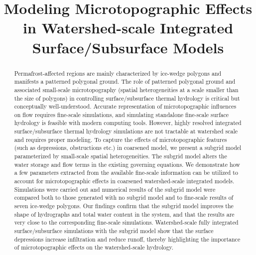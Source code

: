 \documentclass[review,11pt]{elsarticle}
\begin{document}
\begin{frontmatter}

\title{Modeling Microtopographic Effects in Watershed-scale Integrated Surface/Subsurface Models}





\begin{abstract}
Permafrost-affected regions are mainly characterized by ice-wedge polygons and manifests a patterned polygonal ground. The role of patterned polygonal ground and associated small-scale microtopography (spatial heterogeneities at a scale smaller than the size of polygons) in controlling surface/subsurface thermal hydrology is critical but conceptually well-understood. Accurate representation of microtopographic influences on flow requires fine-scale simulations, and simulating standalone fine-scale surface hydrology is feasible with modern computing tools. However, highly resolved integrated surface/subsurface thermal hydrology simulations are not tractable at watershed scale and requires proper modeling. To capture the effects of microtopographic features (such as depressions, obstructions etc.) in coarsened model, we present a subgrid model parameterized by small-scale spatial heterogeneities.  The subgrid model alters the water storage and flow terms in the existing governing equations. We demonstrate how a few parameters extracted from the available fine-scale information can be utilized to account for microtopographic effects in coarsened watershed-scale integrated models.
Simulations were carried out and numerical results of the subgrid model were compared both to those generated with no subgrid model and to fine-scale results of seven ice-wedge polygons. Our findings confirm that the subgrid model improves the shape of hydrographs and total water content in the system, and that the results are very close to the corresponding fine-scale simulations. Watershed-scale fully integrated surface/subsurface simulations with the subgrid model show that the surface depressions increase infiltration and reduce runoff, thereby highlighting the importance of microtopographic effects on the watershed-scale hydrology.
\end{abstract}


\end{frontmatter}
\end{document}
